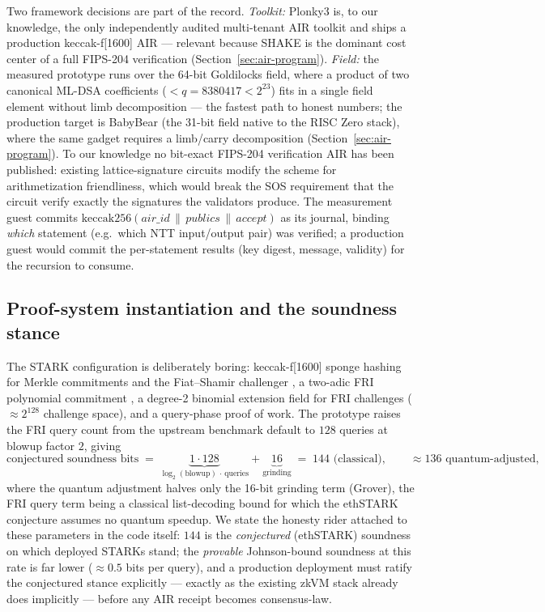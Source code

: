 \documentclass[11pt]{article}
\newcommand{\concat}{\,\|\,}
\theoremstyle{plain}
\theoremstyle{definition}
\theoremstyle{remark}
\begin{document}
Two framework decisions are part of the record. \emph{Toolkit:} Plonky3 is,
to our knowledge, the only independently audited multi-tenant AIR toolkit
\cite{plonky3,plonky3audit2024} and ships a production keccak-f[1600] AIR
--- relevant because SHAKE is the dominant cost center of a full FIPS-204
verification (Section~\ref{sec:air-program}). \emph{Field:} the measured
prototype runs over the 64-bit Goldilocks field, where a product of two
canonical ML-DSA coefficients ($< q = 8380417 < 2^{23}$) fits in a single
field element without limb decomposition --- the fastest path to honest
numbers; the production target is BabyBear (the 31-bit field native to the
RISC Zero stack), where the same gadget requires a limb/carry decomposition
(Section~\ref{sec:air-program}). To our knowledge no bit-exact FIPS-204
verification AIR has been published: existing lattice-signature circuits
modify the scheme for arithmetization friendliness, which would break the
SOS requirement that the circuit verify exactly the signatures the
validators produce. The measurement guest commits
$\mathrm{keccak256}(\mathit{air\_id} \concat \mathit{publics} \concat
\mathit{accept})$ as its journal, binding \emph{which} statement (e.g.\
which NTT input/output pair) was verified; a production guest would commit
the per-statement results (key digest, message, validity) for the recursion
to consume.

\subsection{Proof-system instantiation and the soundness stance}
\label{sec:air-params}

The STARK configuration is deliberately boring: keccak-f[1600] sponge
hashing for Merkle commitments and the Fiat--Shamir challenger
\cite{fips202}, a two-adic FRI polynomial commitment \cite{fri2018}, a
degree-2 binomial extension field for FRI challenges ($\approx 2^{128}$
challenge space), and a query-phase proof of work. The prototype raises the
FRI query count from the upstream benchmark default to $128$ queries at
blowup factor $2$, giving
\[
\text{conjectured soundness bits} \;=\;
\underbrace{1 \cdot 128}_{\log_2(\text{blowup}) \,\cdot\, \text{queries}}
+ \underbrace{16}_{\text{grinding}} \;=\; 144 \text{ (classical)},
\qquad \approx 136 \text{ quantum-adjusted},
\]
where the quantum adjustment halves only the 16-bit grinding term (Grover),
the FRI query term being a classical list-decoding bound for which the
ethSTARK conjecture \cite{ethstark2021} assumes no quantum speedup. We state
the honesty rider attached to these parameters in the code itself: $144$ is
the \emph{conjectured} (ethSTARK) soundness on which deployed STARKs stand;
the \emph{provable} Johnson-bound soundness at this rate is far lower
($\approx 0.5$ bits per query), and a production deployment must ratify the
conjectured stance explicitly --- exactly as the existing zkVM stack already
does implicitly --- before any AIR receipt becomes consensus-law.
\end{document}
